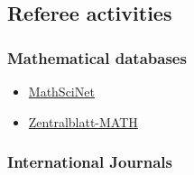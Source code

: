 \documentclass[final, a4paper, oneside, 12pt]{article}
\numberwithin{equation}{section}
\begin{document}
\subsection{Referee activities}

\subsubsection{Mathematical databases}

\begin{itemize}

  \item \href{https://mathscinet.ams.org/}{MathSciNet}

  \item \href{https://zbmath.org/}{Zentralblatt-MATH}

\end{itemize}

\subsubsection{International Journals}
\end{document}
